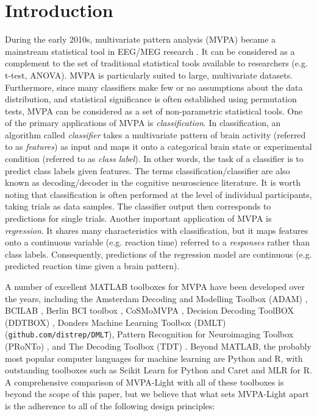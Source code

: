 \documentclass[utf8]{frontiersSCNS} %
\begin{document}
\section{Introduction}

During the early 2010s, multivariate pattern analysis (MVPA) became a mainstream statistical tool in EEG/MEG research \citep{Blankertz2011,Lemm2011,Mur2009,Grootswagers2017DecodingData,Pereira2009,Varoquaux2017}. It can be considered as a complement to the set of traditional statistical tools available to researchers (e.g. t-test, ANOVA). MVPA is particularly suited to large, multivariate datasets. Furthermore, since many classifiers make few or no assumptions about the data distribution, and statistical significance is often established using permutation tests, MVPA can be considered as a set of non-parametric statistical tools.
One of the primary applications of MVPA is \textit{classification}. In classification, an algorithm called \textit{classifier} takes a multivariate pattern of brain activity (referred to as \textit{features}) as input and maps it onto a categorical brain state or experimental condition (referred to as \textit{class label}). In other words, the task of a classifier is to predict class labels given features. The terms classification/classifier are also known as decoding/decoder in the cognitive neuroscience literature. It is worth noting that classification is often performed at the level of individual participants, taking trials as data samples. The classifier output then corresponds to predictions for single trials. Another important application of MVPA is \textit{regression}. It shares many characteristics with classification, but it maps features onto a continuous variable (e.g. reaction time) referred to a \textit{responses} rather than class labels. Consequently, predictions of the regression model are continuous  (e.g. predicted reaction time given a brain pattern).

A number of excellent MATLAB toolboxes for MVPA have been developed over the years, including the Amsterdam Decoding and Modelling Toolbox (ADAM) \citep{Fahrenfort2018FromADAM}, BCILAB \citep{Kothe2013BCILAB:Development}, Berlin BCI toolbox \citep{Blankertz2016TheControl}, CoSMoMVPA \citep{Oosterhof2016CoSMoMVPA:Octave}, Decision Decoding ToolBOX (DDTBOX) \citep{Bode2019ThePotentials}, Donders Machine Learning Toolbox (DMLT) (\texttt{github.com/distrep/DMLT}), Pattern Recognition for Neuroimaging Toolbox (PRoNTo) \citep{Schrouff2013PRoNTo:Toolbox}, and The Decoding Toolbox (TDT) \citep{Hebart2015TheData}. Beyond MATLAB, the probably most popular computer languages for machine learning are Python and R, with outstanding toolboxes such as Scikit Learn \citep{Pedregosa2011Scikit-learn:Python} for Python and Caret \citep{Kuhn2008BuildingPackage} and MLR \citep{Bischl2000Mlr:R} for R. A comprehensive comparison of MVPA-Light with all of these toolboxes is beyond the scope of this paper, but we believe that what sets MVPA-Light apart is the adherence to all of the following design principles: 
\end{document}
